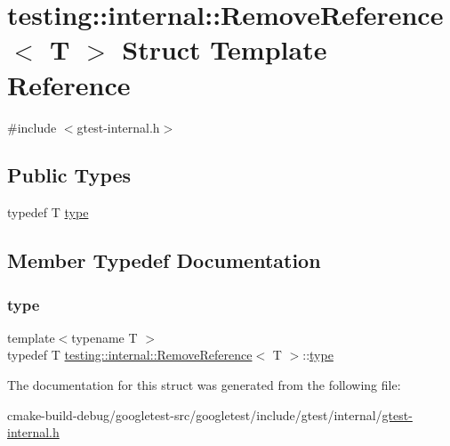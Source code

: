 \hypertarget{structtesting_1_1internal_1_1RemoveReference}{}\section{testing\+::internal\+::Remove\+Reference$<$ T $>$ Struct Template Reference}
\label{structtesting_1_1internal_1_1RemoveReference}


{\ttfamily \#include $<$gtest-\/internal.\+h$>$}

\subsection*{Public Types}
\begin{DoxyCompactItemize}
\item 
typedef T \mbox{\hyperlink{structtesting_1_1internal_1_1RemoveReference_a9ca4f6499579225f7986b789ee4b2895}{type}}
\end{DoxyCompactItemize}


\subsection{Member Typedef Documentation}
\mbox{\label{structtesting_1_1internal_1_1RemoveReference_a9ca4f6499579225f7986b789ee4b2895}} 
\subsubsection{\texorpdfstring{type}{type}}
{\footnotesize\ttfamily template$<$typename T $>$ \\
typedef T \mbox{\hyperlink{structtesting_1_1internal_1_1RemoveReference}{testing\+::internal\+::\+Remove\+Reference}}$<$ T $>$\+::\mbox{\hyperlink{structtesting_1_1internal_1_1RemoveReference_a9ca4f6499579225f7986b789ee4b2895}{type}}}



The documentation for this struct was generated from the following file\+:\begin{DoxyCompactItemize}
\item 
cmake-\/build-\/debug/googletest-\/src/googletest/include/gtest/internal/\mbox{\hyperlink{gtest-internal_8h}{gtest-\/internal.\+h}}\end{DoxyCompactItemize}
